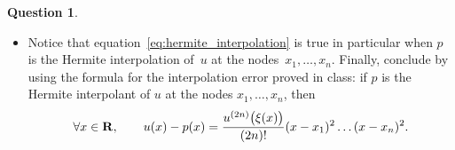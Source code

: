 \documentclass[11pt]{article}
\theoremstyle{definition}
\newtheorem{question}{Question}
\begin{document}
\begin{question}
\begin{enumerate}
\begin{itemize}
                        \item
                            Notice that equation~\eqref{eq:hermite_interpolation} is true in particular when $p$ is the Hermite interpolation of~$u$ at the nodes~$x_1, \dotsc, x_n$.
                            Finally, conclude by using the formula for the interpolation error proved in class:
                            if $p$ is the Hermite interpolant of $u$ at the nodes $x_1, \dotsc, x_n$,
                        then
                        \[
                            \forall x \in \mathbf R, \qquad
                            u(x) - p(x) = \frac{u^{(2n)}\bigl(\xi(x)\bigr)}{(2n)!} (x-x_1)^2 \dotsc (x - x_n)^2.
                        \]
                    \end{itemize}
    \end{enumerate}

\end{question}
\end{document}

